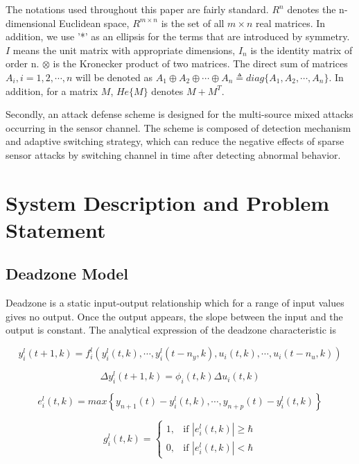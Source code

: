 \documentclass[journal,onecolumn]{IEEEtran}
\begin{document}
The notations used throughout this paper are fairly standard.
 $R^n$ denotes the n-dimensional Euclidean space, $R^{m\times n}$ is the
 set of all $m \times n$ real matrices. In addition, we use '*' as
 an ellipsis for the terms that are introduced by symmetry. $I$
 means the unit matrix with appropriate dimensions, $I_n$ is the
 identity matrix of order n.
 $\otimes$ is the Kronecker product of two matrices. The direct sum
 of matrices $A_i, i=1,2,\cdots, n$ will be denoted as
 $A_1\oplus A_2\oplus \cdots \oplus
  A_n \triangleq diag\{A_1,A_2,\cdots,A_n\}$.
In addition, for a matrix $M$, $He\{M\}$ denotes $M+M^T$.%

Secondly, an attack defense scheme is designed for the multi-source mixed attacks occurring in the sensor channel. The scheme is composed of detection mechanism and adaptive switching strategy, which can reduce the negative effects of sparse sensor attacks by switching channel in time after detecting abnormal behavior.

\section{System Description and Problem Statement}

\subsection{Deadzone Model}
Deadzone is a static input-output relationship which for a range of
input values gives no output. Once the output appears, the slope
between the input and the output is constant. The analytical
expression of the deadzone characteristic is

\begin{equation}
\label{model 1}
y_i^l(t+1,k)=f_i^l(y_i^l(t,k),\cdots,y_i^l(t-n_y,k),u_i(t,k),\cdots,u_i(t-n_u,k))
\end{equation}

\begin{equation}
\label{model 2}
\Delta y_i^l(t+1,k)=\phi_i(t,k)\Delta u_i(t,k)
\end{equation}

\begin{equation}
\label{model 3}
e_i^l(t,k)=max\left\{y_{n+1}(t)-y_i^l(t,k),\cdots,y_{n+p}(t)-y_i^l(t,k)\right\}
\end{equation}

\begin{equation}
\label{model 4}
g_i^l(t,k)=\begin{cases}
1,& \text{if }\left|e_i^l(t,k)\right|\ge\hbar  \\
0,& \text{if }\left|e_i^l(t,k)\right|< \hbar
\end{cases}
\end{equation}
\end{document}
